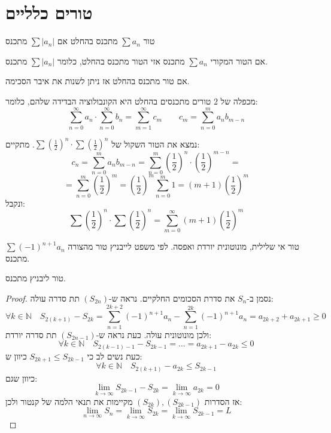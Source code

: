 \documentclass{tstextbook}
\begin{document}
\section{טורים כלליים}

\begin{definition}
טור \(\sum a_{n}\) מתכנס בהחלט אם \(\sum\lvert a_{n} \rvert\) מתכנס

\end{definition}
\begin{proposition}
אם הטור המקורי \(\sum a_{n}\) מתכנס אזי הטור מתכנס בהחלט, כלומר \(\sum\lvert a_{n} \rvert\) מתכנס.

\end{proposition}
\begin{proposition}
אם טור מתכנס בהחלט אז ניתן לשנות את איבר הסכימה.

\end{proposition}
\begin{proposition}
מכפלה של 2 טורים מתכנסים בהחלט היא הקונבולוציה הבדידה שלהם, כלומר:
$$\sum_{n=0}^\infty a_n \cdot \sum_{n=0}^\infty b_n = \sum_{m=1}^\infty c_m \qquad c_m = \sum_{n=0}^m a_n b_{m-n}$$

\end{proposition}
\begin{example}
נמצא את הטור השקול של \(\sum \left(\frac{1}{2}\right)^n \cdot \sum \left(\frac{1}{2}\right)^n\). מתקיים:
$$c_n = \sum_{n=0}^m a_n b_{m-n} = \sum_{n=0}^m \left(\frac{1}{2}\right)^n \cdot \left(\frac{1}{2}\right)^{m-n}=$$$$= \sum_{n=0}^m \left(\frac{1}{2}\right)^m = \left(\frac{1}{2}\right)^m \sum_{n=0}^m 1 = (m+1)\left(\frac{1}{2}\right)^m$$
ונקבל:
$$\sum \left(\frac{1}{2}\right)^n \cdot \sum \left(\frac{1}{2}\right)^n = \sum_{m=0}^\infty (m+1) \left(\frac{1}{2}\right)^m$$

\end{example}
\begin{definition}
טור אי שלילית, מונוטונית יורדת ואפסה. לפי משפט לייבניץ טור מהצורה \(\sum(-1)^{n+1} a_n\) מתכנס.

\end{definition}
\begin{proposition}
טור ליבניץ מתכנס.

\end{proposition}
\begin{proof}
נסמן ב-\(S_{n}\) את סדרת הסכומים החלקיים. נראה ש-\((S_{2n})\) תת סדרה עולה:
$$\forall k \in \mathbb{N}\quad S_{2(k+1)}-S_{2k}=\sum_{n=1}^{2k+2}(-1)^{n+1}a_{n}-\sum_{n=1}^{2k}(-1)^{n+1} a_{n}=a_{2k+2}+a_{2k+1}\geq 0$$
ולכן מונוטונית עולה. כעת נראה ש-\((S_{2n-1})\) תת סדרה יורדת:
$$\forall k \in \mathbb{N}\quad S_{2(k-1)-1}-S_{2k-1}=\dots =a_{2k+1}-a_{2k}\leq 0$$
כעת נשים לב כי \(S_{2k+1}\leq S_{2k-1}\) כיוון ש:
$$\forall k \in \mathbb{N}\quad  S_{2(k+1)}-a_{2k}\leq S_{2k-1}$$
כיוון שגם:
$$\lim_{ k \to \infty } S_{2k-1}-S_{2k}=\lim_{ k \to \infty } a_{2k}=0 $$
אז הסדרות \((S_{2k}),(S_{2k-1})\) מקיימות את תנאי הלמה של קנטור ולכן:
$$\lim_{ n \to \infty } S_{n}=\lim_{ k \to \infty } S_{2k}=\lim_{ k \to \infty } S_{2k-1}=L$$

\end{proof}
\end{document}
